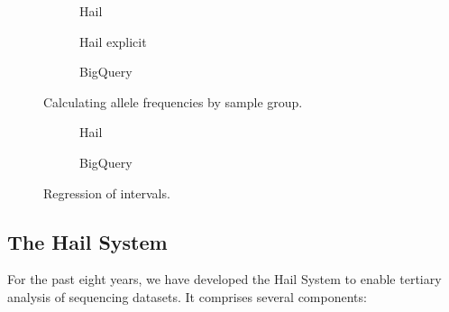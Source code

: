 \documentclass[sigconf, nonacm]{acmart}
\begin{document}
\begin{figure}[h]
  \begin{subfigure}{0.5\textwidth}
    
    \caption{Hail}
    \label{fig:query-example-two-hail-builtin}
  \end{subfigure}

  \begin{subfigure}{0.5\textwidth}
    
    \caption{Hail explicit}
    \label{fig:query-example-two-hail}
  \end{subfigure}

  \begin{subfigure}{0.5\textwidth}
    
    \caption{BigQuery}
    \label{fig:query-example-two-bigquery}
  \end{subfigure}
  \caption{Calculating allele frequencies by sample group.}
  \label{fig:query-example-two}
\end{figure}

\begin{figure}[h]
  \begin{subfigure}{0.5\textwidth}
    
    \caption{Hail}
    \label{fig:query-example-three-hail}
  \end{subfigure}

  \begin{subfigure}{0.5\textwidth}
    
    \caption{BigQuery}
    \label{fig:query-example-three-bigquery}
  \end{subfigure}
  \caption{Regression of intervals.}
  \label{fig:query-example-three}
\end{figure}

\subsection{The Hail System}

For the past eight years, we have developed the Hail System to enable tertiary analysis of
sequencing datasets. It comprises several components:
\end{document}
